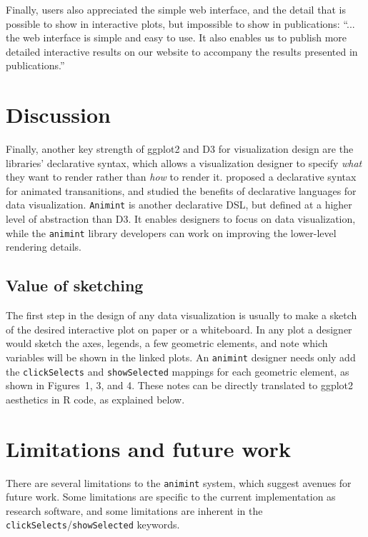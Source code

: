 \documentclass[12pt]{article}\usepackage[]{graphicx}\usepackage[]{color}
\begin{document}
Finally, users also appreciated the simple web interface, and the
detail that is possible to show in interactive plots, but impossible
to show in publications: ``...  the web interface is simple and easy
to use.  It also enables us to publish more detailed interactive
results on our website to accompany the results presented in
publications.''

\section{Discussion}

Finally, another key strength of ggplot2 and D3 for visualization
design are the libraries' declarative syntax, which allows a
visualization designer to specify \emph{what} they want to render
rather than \emph{how} to render it. \citet{declarative} proposed a
declarative syntax for animated transanitions, and studied the
benefits of declarative languages for data visualization. \texttt{Animint} is
another declarative DSL, but defined at a higher level of abstraction
than D3. It enables designers to focus on data visualization, while
the \texttt{animint} library developers can work on improving the lower-level
rendering details.

\subsection{Value of sketching}

The first step in the design of any data visualization is usually to
make a sketch of the desired interactive plot on paper or a
whiteboard.  In any plot a designer would sketch the axes, legends, a
few geometric elements, and note which variables will be shown in the
linked plots. An \texttt{animint} designer needs only add the
\texttt{clickSelects} and \texttt{showSelected} mappings for
each geometric element, as shown in Figures~1, 3, and 4. These notes
can be directly translated to ggplot2 aesthetics in R code, as
explained below.


\section{Limitations and future work}

There are several limitations to the \texttt{animint} system, which suggest
avenues for future work. Some limitations are specific to the current
implementation as research software, and some limitations are inherent
in the \texttt{clickSelects}/\texttt{showSelected} keywords.
\end{document}
